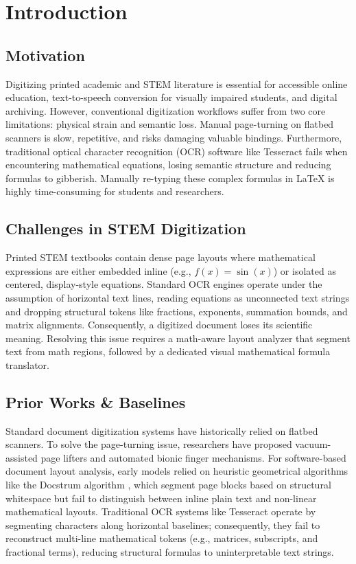 \documentclass[conference]{IEEEtran}
\begin{document}
\section{Introduction}
\label{sec:intro}

\subsection{Motivation}
Digitizing printed academic and STEM literature is essential for accessible online education, text-to-speech conversion for visually impaired students, and digital archiving. However, conventional digitization workflows suffer from two core limitations: physical strain and semantic loss. Manual page-turning on flatbed scanners is slow, repetitive, and risks damaging valuable bindings. Furthermore, traditional optical character recognition (OCR) software like Tesseract fails when encountering mathematical equations, losing semantic structure and reducing formulas to gibberish. Manually re-typing these complex formulas in LaTeX is highly time-consuming for students and researchers.

\subsection{Challenges in STEM Digitization}
Printed STEM textbooks contain dense page layouts where mathematical expressions are either embedded inline (e.g., $f(x) = \sin(x)$) or isolated as centered, display-style equations. Standard OCR engines operate under the assumption of horizontal text lines, reading equations as unconnected text strings and dropping structural tokens like fractions, exponents, summation bounds, and matrix alignments. Consequently, a digitized document loses its scientific meaning. Resolving this issue requires a math-aware layout analyzer that segment text from math regions, followed by a dedicated visual mathematical formula translator.

\subsection{Prior Works \& Baselines}
Standard document digitization systems have historically relied on flatbed scanners. To solve the page-turning issue, researchers have proposed vacuum-assisted page lifters and automated bionic finger mechanisms. For software-based document layout analysis, early models relied on heuristic geometrical algorithms like the Docstrum algorithm \cite{docstrum}, which segment page blocks based on structural whitespace but fail to distinguish between inline plain text and non-linear mathematical layouts. Traditional OCR systems like Tesseract \cite{tesseract} operate by segmenting characters along horizontal baselines; consequently, they fail to reconstruct multi-line mathematical tokens (e.g., matrices, subscripts, and fractional terms), reducing structural formulas to uninterpretable text strings.
\end{document}
